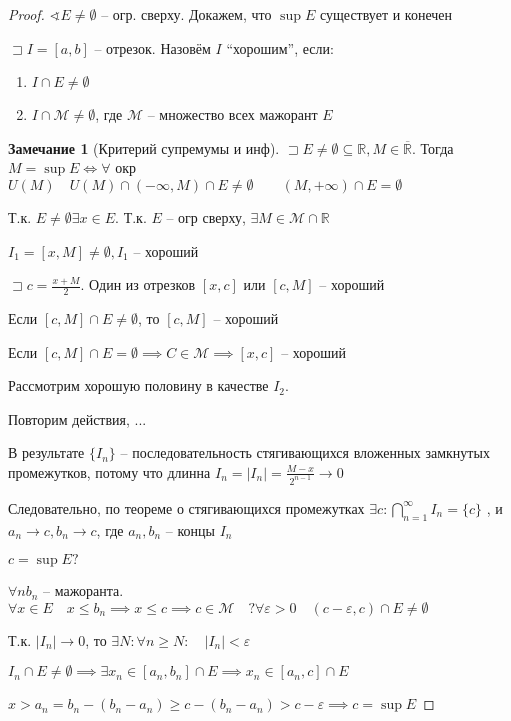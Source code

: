 \documentclass{book}
\newcommand\R{\ensuremath{\mathbb{R}}}
\renewcommand\O{\ensuremath{\emptyset}}
\newcommand{\ov}[1]{\overline{#1}}
\theoremstyle{definition}
\newtheorem*{note}{Замечание}
\begin{document}
\begin{proof}
    $\sphericalangle E\neq \O $ -- огр. сверху. Докажем, что $\sup E$ существует и конечен 

    $\sqsupset I = [a,b]$ -- отрезок. Назовём $I$ ``хорошим'', если:
     \begin{enumerate}
        \item $I\cap E\neq \O $
        \item $I \cap \mathscr{M}  \neq \O $, где $\mathscr{M}$ -- множество всех мажорант $E$
    \end{enumerate}

    \begin{note}
        [Критерий супремумы и инф]

        $\sqsupset E\neq \O \subseteq \R, M\in \ov{\R}$. Тогда $M = \sup E \iff  \forall $ окр $U(M)\quad U(M)\cap (-\infty , M)\cap E\neq \O \qquad (M, +\infty )\cap E=\O $
    \end{note}

    Т.к. $E\neq \O \exists x\in E. $ Т.к. $E$ -- огр сверху,  $\exists M\in \mathscr{M}\cap \R$

    $I_1 = [x, M]\neq \O , I_1$ -- хороший

    $\sqsupset c = \frac{x+M}{2}$. Один из отрезков $[x, c]$ или  $[c, M]$ -- хороший

    Если  $[c, M]\cap E\neq \O $, то $[c, M]$ -- хороший

    Если  $[c, M]\cap E=\O \implies C\in \mathscr{M} \implies [x,c]$ -- хороший

    Рассмотрим хорошую половину в качестве $I_2$.

    Повторим действия, ...

    В результате $\{I_n\}$ -- последовательность стягивающихся вложенных замкнутых промежутков, потому что длинна  $I_n = |I_n| = \frac{M-x}{2^{n-1}} \to 0 $ 

    Следовательно, по теореме о стягивающихся промежутках $\exists c: \bigcap\limits_{n=1}^{\infty }I_n = \{c\}$ , и $ a_n\to c, b_n\to c$, где $a_n, b_n$ -- концы  $I_n$

     $c = \sup E?$

     $\forall n b_n$ -- мажоранта. $\forall x\in E\quad x\leqslant b_n \implies x\leqslant c \implies c\in \mathscr{M}\quad? \forall \varepsilon>0\quad (c-\varepsilon, c)\cap E\neq \O $

     Т.к. $\left| I_n \right| \to 0$, то $\exists N: \forall n\geqslant N:\quad \left| I_n \right| <\varepsilon$ 

     $I_n\cap E\neq \O \implies \exists x_n\in [a_n, b_n]\cap E \implies x_n\in [a_n, c]\cap E$

     $x>a_n = b_n-(b_n-a_n)\geqslant c - (b_n-a_n)>c-\varepsilon\implies c = \sup E$
\end{proof}
\end{document}
